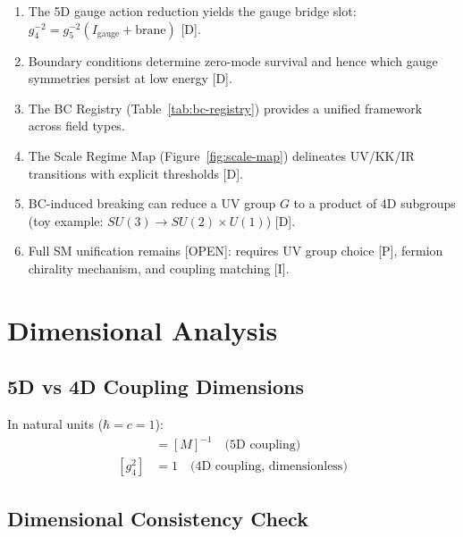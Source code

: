 \documentclass[11pt,a4paper]{article}
\begin{document}
\begin{enumerate}
  \item The 5D gauge action reduction yields the gauge bridge slot:
        $g_4^{-2} = g_5^{-2} (I_{\text{gauge}} + \text{brane})$ [D].

  \item Boundary conditions determine zero-mode survival and hence which
        gauge symmetries persist at low energy [D].

  \item The BC Registry (Table~\ref{tab:bc-registry}) provides a unified
        framework across field types.

  \item The Scale Regime Map (Figure~\ref{fig:scale-map}) delineates UV/KK/IR
        transitions with explicit thresholds [D].

  \item BC-induced breaking can reduce a UV group $G$ to a product of 4D
        subgroups (toy example: $SU(3) \to SU(2) \times U(1)$) [D].

  \item Full SM unification remains [OPEN]: requires UV group choice [P],
        fermion chirality mechanism, and coupling matching [I].
\end{enumerate}

\appendix

\section{Dimensional Analysis}
\label{app:dimensions}

\subsection{5D vs 4D Coupling Dimensions}

In natural units ($\hbar = c = 1$):
\begin{align}
  [g_5^2] &= [M]^{-1} \quad \text{(5D coupling)} \label{eq:dim-g5} \\
  [g_4^2] &= 1 \quad \text{(4D coupling, dimensionless)} \label{eq:dim-g4}
\end{align}

\subsection{Dimensional Consistency Check}
\end{document}
